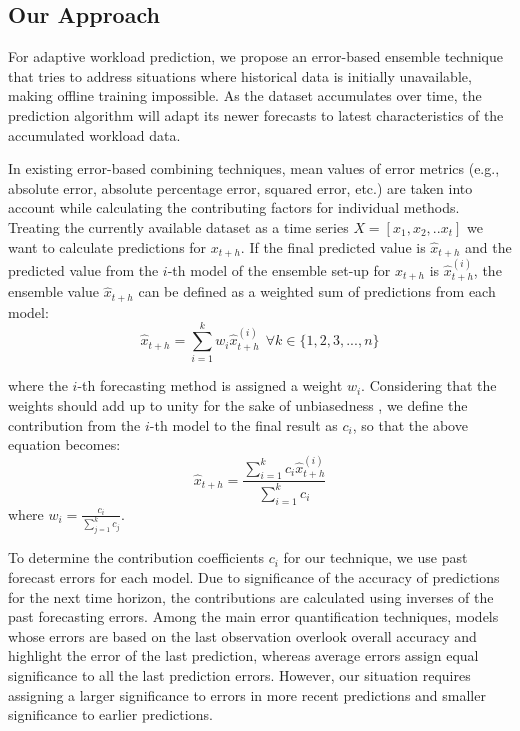 \subsection{Our Approach}

For adaptive workload prediction, we propose an error-based ensemble technique that tries to address situations where historical data is initially unavailable, making offline training impossible. As the dataset accumulates over time, the prediction algorithm will adapt its newer forecasts to latest characteristics of the accumulated workload data.

In existing error-based combining techniques, mean values of error metrics (e.g., absolute error, absolute percentage error, squared error, etc.) are taken into account while calculating the contributing factors for individual methods. 
Treating the currently available dataset as a time series
$X=[x_{1},x_{2},.. x_{t}]$
we want to calculate predictions for $x_{t+h}$. If the final predicted value is $\hat{x}_{t+h}$ and the predicted value from the $i$-th model of the ensemble set-up for $x_{t+h}$ is $\hat{x}_{t+h}^{(i)}$, the ensemble value $\hat{x}_{t+h}$ can be defined as a weighted sum of predictions from each model:
\begin{equation}
\hat{x}_{t+h}= \sum_{i=1}^{k}w_i \hat{x}_{t+h}^{(i)} \ \ \forall k \in \{1,2,3,...,n\}
\end{equation}

where the $i$-th forecasting method is assigned a weight $w_i$. Considering that the weights should add up to unity for the sake of unbiasedness \cite{Adhikari_2012}, we define the contribution from the $i$-th model to the final result as $c_i$, so that the above equation becomes:
\begin{equation}
\hat{x}_{t+h}= \frac{\sum_{i=1}^{k}c_i \hat{x}_{t+h}^{(i)}}{\sum_{i=1}^{k}c_i}
\end{equation}
where $w_{i}= \frac{c_{i}}{\sum_{j=1}^{k}c_j}$.

To determine the contribution coefficients $c_i$ for our technique, we use past forecast errors for each model. Due to significance of the accuracy of predictions for the next time horizon, the contributions are calculated using inverses of the past forecasting errors. Among the main error quantification techniques, models whose errors are based on the last observation overlook overall accuracy and highlight the error of the last prediction, whereas  average errors assign equal significance to all the last prediction errors. However, our situation requires assigning a larger significance to errors in more recent predictions and smaller significance to earlier predictions.

